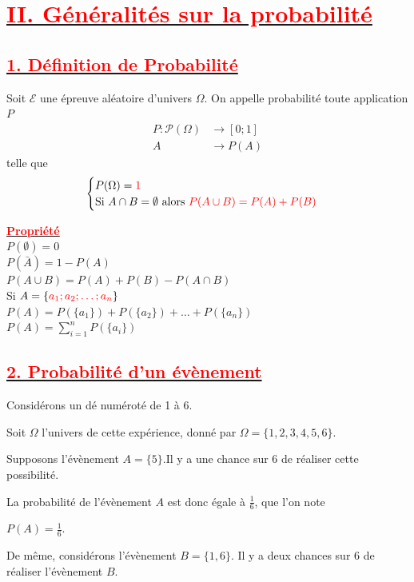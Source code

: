 \documentclass[12pt,a4paper]{article}
\begin{document}
\section*{\underline{\textbf{\textcolor{red}{II. Généralités sur la probabilité}}}}
\subsection*{\underline{\textbf{\textcolor{red}{1. Définition de Probabilité}}}}

Soit $\mathcal{E}$ une épreuve aléatoire d'univers $\Omega$. On appelle probabilité toute application $P$
\begin{align*}
    P : \mathcal{P}(\Omega) &\longrightarrow [0 ; 1] \\
    A &\longrightarrow P(A)
\end{align*}
telle que
\[
\begin{cases}
    P(\Omega) = \textcolor{red}{1} \\
    \text{Si } A \cap B = \emptyset \text{ alors } \textcolor{red}{P(A \cup B) = P(A) + P(B)}
\end{cases}
\]

\underline{\textbf{\textcolor{red}{Propriété}}}\\
$P(\emptyset) = 0$ \\
$P(\bar{A}) = 1 - P(A)$ \\
$P(A \cup B) = P(A) + P(B) - P(A \cap B)$ \\
\indent Si $A = \{\textcolor{red}{a_1 ; a_2 ; \dots ; a_n}\}$ \\
$P(A) = P(\{a_1\}) + P(\{a_2\}) + \dots + P(\{a_n\})$ \\
$P(A) = \sum_{i=1}^{n} P(\{a_i\})$

\subsection*{\underline{\textbf{\textcolor{red}{2. Probabilité d'un évènement}}}}

Considérons un dé numéroté de 1 à 6.

Soit $\Omega$ l'univers de cette expérience, donné par $\Omega=\{1, 2, 3, 4, 5, 6\}$.

Supposons l'évènement $A=\{5\}$.Il y a une chance sur 6 de réaliser cette possibilité.

La probabilité de l'évènement $A$ est donc égale à $\frac{1}{6}$, que l'on note

 $P(A)=\frac{1}{6}$.

De même, considérons l'évènement $B=\{1, 6\}$. Il y a deux chances sur 6 de réaliser l'évènement $B$.
\end{document}

